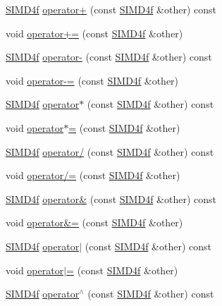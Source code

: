 \begin{DoxyCompactItemize}
\item 
\hyperlink{class_s_i_m_d4f}{S\+I\+M\+D4f} \hyperlink{class_s_i_m_d4f_a37059580a943f034510927272fa06c38}{operator+} (const \hyperlink{class_s_i_m_d4f}{S\+I\+M\+D4f} \&other) const 
\item 
void \hyperlink{class_s_i_m_d4f_ab547cee5fcc6f68c1e5e74c9e14cd564}{operator+=} (const \hyperlink{class_s_i_m_d4f}{S\+I\+M\+D4f} \&other)
\item 
\hyperlink{class_s_i_m_d4f}{S\+I\+M\+D4f} \hyperlink{class_s_i_m_d4f_a35950395f46f9e1e07e949ade9664876}{operator-\/} (const \hyperlink{class_s_i_m_d4f}{S\+I\+M\+D4f} \&other) const 
\item 
void \hyperlink{class_s_i_m_d4f_a6b83a005afad9d0cbafd6aa91387fbc5}{operator-\/=} (const \hyperlink{class_s_i_m_d4f}{S\+I\+M\+D4f} \&other)
\item 
\hyperlink{class_s_i_m_d4f}{S\+I\+M\+D4f} \hyperlink{class_s_i_m_d4f_a7c3566f2b6ec0dba55e889dcbadd48f0}{operator$\ast$} (const \hyperlink{class_s_i_m_d4f}{S\+I\+M\+D4f} \&other) const 
\item 
void \hyperlink{class_s_i_m_d4f_a6a74b6d3b0681777b34e3de2b47110c6}{operator$\ast$=} (const \hyperlink{class_s_i_m_d4f}{S\+I\+M\+D4f} \&other)
\item 
\hyperlink{class_s_i_m_d4f}{S\+I\+M\+D4f} \hyperlink{class_s_i_m_d4f_a8eb9f3ee0c70ef4569a875aead8b4985}{operator/} (const \hyperlink{class_s_i_m_d4f}{S\+I\+M\+D4f} \&other) const 
\item 
void \hyperlink{class_s_i_m_d4f_a3b6b3c49cfd05e88a3cb69edeef75b6c}{operator/=} (const \hyperlink{class_s_i_m_d4f}{S\+I\+M\+D4f} \&other)
\item 
\hyperlink{class_s_i_m_d4f}{S\+I\+M\+D4f} \hyperlink{class_s_i_m_d4f_a1df8ad0c155adc333d43da786c7fcc69}{operator\&} (const \hyperlink{class_s_i_m_d4f}{S\+I\+M\+D4f} \&other) const 
\item 
void \hyperlink{class_s_i_m_d4f_a870101dc4dff1951f6aa74b01dbd875d}{operator\&=} (const \hyperlink{class_s_i_m_d4f}{S\+I\+M\+D4f} \&other)
\item 
\hyperlink{class_s_i_m_d4f}{S\+I\+M\+D4f} \hyperlink{class_s_i_m_d4f_ae2364977959dbd7e38cfad50b449dab5}{operator$\vert$} (const \hyperlink{class_s_i_m_d4f}{S\+I\+M\+D4f} \&other) const 
\item 
void \hyperlink{class_s_i_m_d4f_a8ff9a65196ceec407c9b3f4adf3a1911}{operator$\vert$=} (const \hyperlink{class_s_i_m_d4f}{S\+I\+M\+D4f} \&other)
\item 
\hyperlink{class_s_i_m_d4f}{S\+I\+M\+D4f} \hyperlink{class_s_i_m_d4f_a0aac563f1f7e9326b84a78d04995041a}{operator$^\wedge$} (const \hyperlink{class_s_i_m_d4f}{S\+I\+M\+D4f} \&other) const 

\end{DoxyCompactItemize}
